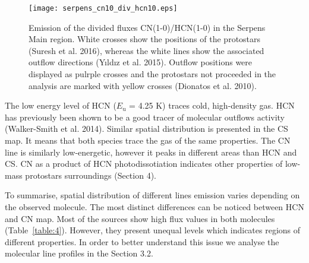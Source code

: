 \documentclass{aa}
\begin{document}
\begin{figure}
   \centering
   \texttt{[image: serpens\_cn10\_div\_hcn10.eps]}
      \caption{Emission of the divided fluxes CN(1-0)/HCN(1-0) in the Serpens Main region. White crosses show the positions of the protostars (Suresh et al. 2016), whereas the white lines show the associated outflow directions (Y{\i}ld{\i}z et al. 2015). Outflow positions were displayed as pulrple crosses and the protostars not proceeded in the analysis are marked with yellow crosses (Dionatos et al. 2010).}
         \label{cn10_div_hcn10}
   \end{figure}

The low energy level of HCN ($E_\mathrm{u}$ = 4.25 K) traces cold, high-density gas. HCN has previously been shown to be a good tracer of molecular outflows activity (Walker-Smith et al. 2014). Similar spatial distribution is presented in the CS map. It means that both species trace the gas of the same properties. The CN line is similarly low-energetic, however it peaks in different areas than HCN and CS. CN as a product of HCN photodissotiation indicates other properties of low-mass protostars surroundings (Section 4).

To summarise, spatial distribution of different lines emission varies depending on the observed molecule. The most distinct differences can be noticed between HCN and CN map. Most of the sources show high flux values in both molecules (Table~\ref{table:4}). However, they present unequal levels which indicates regions of different properties. In order to better understand this issue we analyse the molecular line profiles in the Section 3.2. 
\end{document}
